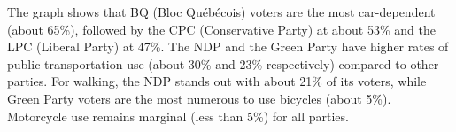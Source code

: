 \documentclass[
  letterpaper,
  DIV=11,
  numbers=noendperiod]{scrartcl}
\begin{document}
The graph shows that BQ (Bloc Québécois) voters are the most
car-dependent (about 65\%), followed by the CPC (Conservative Party) at
about 53\% and the LPC (Liberal Party) at 47\%. The NDP and the Green
Party have higher rates of public transportation use (about 30\% and
23\% respectively) compared to other parties. For walking, the NDP
stands out with about 21\% of its voters, while Green Party voters are
the most numerous to use bicycles (about 5\%). Motorcycle use remains
marginal (less than 5\%) for all parties.
\end{document}
